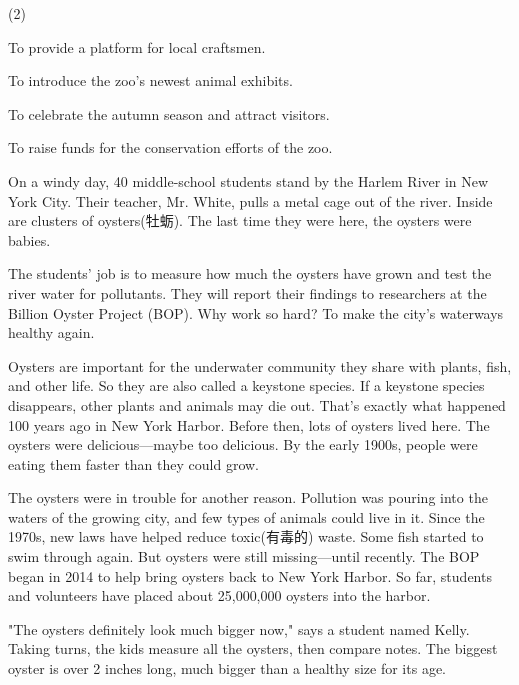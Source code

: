 \documentclass{英语试卷}
\begin{document}
\begin{choices}(2)
  \item To provide a platform for local craftsmen.
  \item To introduce the zoo's newest animal exhibits.
  \item To celebrate the autumn season and attract visitors.
  \item To raise funds for the conservation efforts of the zoo.
\end{choices}
\par On a windy day, 40 middle-school students stand by the Harlem River in New York City. Their teacher, Mr. White, pulls a metal cage out of the river. Inside are clusters of oysters(牡蛎). The last time they were here, the oysters were babies.\par
\par The students' job is to measure how much the oysters have grown and test the river water for pollutants. They will report their findings to researchers at the Billion Oyster Project (BOP). Why work so hard? To make the city's waterways healthy again.\par
\par Oysters are important for the underwater community they share with plants, fish, and other life. So they are also called a keystone species. If a keystone species disappears, other plants and animals may die out. That's exactly what happened 100 years ago in New York Harbor. Before then, lots of oysters lived here. The oysters were delicious—maybe too delicious. By the early 1900s, people were eating them faster than they could grow.\par
\par The oysters were in trouble for another reason. Pollution was pouring into the waters of the growing city, and few types of animals could live in it. Since the 1970s, new laws have helped reduce toxic(有毒的) waste. Some fish started to swim through again. But oysters were still missing—until recently. The BOP began in 2014 to help bring oysters back to New York Harbor. So far, students and volunteers have placed about 25,000,000 oysters into the harbor.\par
\par "The oysters definitely look much bigger now," says a student named Kelly. Taking turns, the kids measure all the oysters, then compare notes. The biggest oyster is over 2 inches long, much bigger than a healthy size for its age.\par
\end{document}

